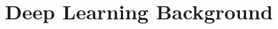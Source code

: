 \documentclass[12pt]{report}
\begin{document}
\chapter{Deep Learning Background}




\end{document}
